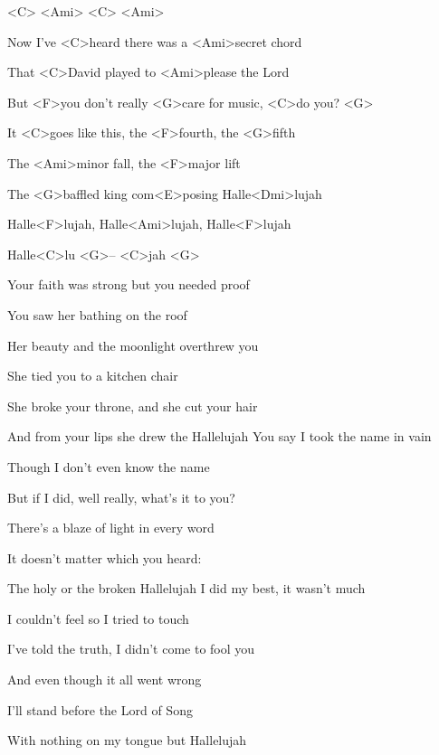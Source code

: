 

<C> <Ami> <C> <Ami>

\zs
Now I've <C>heard there was a <Ami>secret chord

That <C>David played to <Ami>please the Lord

But <F>you don't really <G>care for music, <C>do you? <G>

It <C>goes like this, the <F>fourth, the <G>fifth

The <Ami>minor fall, the <F>major lift

The <G>baffled king com<E>posing Halle<Dmi>lujah
\ks

\zr
Halle<F>lujah, Halle<Ami>lujah, Halle<F>lujah

Halle<C>lu <G>-- <C>jah <G>
\kr

\zs
Your faith was strong but you needed proof

You saw her bathing on the roof

Her beauty and the moonlight overthrew you

She tied you to a kitchen chair

She broke your throne, and she cut your hair

And from your lips she drew the Hallelujah
\ks
\zr \kr
\zs
You say I took the name in vain

Though I don't even know the name

But if I did, well really, what's it to you?

There's a blaze of light in every word

It doesn't matter which you heard:

The holy or the broken Hallelujah
\ks
\zr \kr
\zs
I did my best, it wasn't much

I couldn't feel so I tried to touch

I've told the truth, I didn't come to fool you

And even though it all went wrong

I'll stand before the Lord of Song

With nothing on my tongue but Hallelujah
\ks
\zr \kr
\kp
